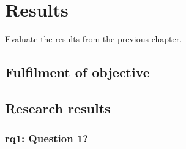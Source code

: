 \chapter{Results}\label{ch:results}

Evaluate the results from the previous chapter.

\section{Fulfilment of objective}\label{sec:results-fulfilment}


\section{Research results}\label{sec:results-research}

\subsection[\acs{rq}1]{\ac{rq}1: Question 1?}\label{subsec:ra1}